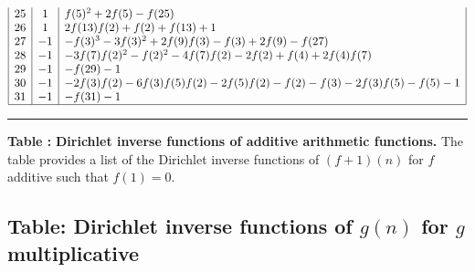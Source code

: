 \documentclass[11pt,reqno,a4letter]{article}
\numberwithin{figure}{section}
\numberwithin{table}{section}
\theoremstyle{plain}
\numberwithin{theorem}{section}
\theoremstyle{definition}
\newcommand{\NBRef}[1]{
     \todo[linecolor=green!85!white,backgroundcolor=orange!50!white,bordercolor=blue!30!black,textcolor=cyan!15!black,shadow,size=\small,fancyline]{
     \color{NBRefColor}{\textbf{#1}
     }
     }
}
\begin{document}
\begin{table}[h!]
\begin{equation*}
{\begin{array}{|c|c|l|}
 25 & 1 & f(5)^2+2 f(5)-f(25) \\
 26 & 1 & 2 f(13) f(2)+f(2)+f(13)+1 \\
 27 & -1 & -f(3)^3-3 f(3)^2+2 f(9) f(3)-f(3)+2 f(9)-f(27) \\
 28 & -1 & -3 f(7) f(2)^2-f(2)^2-4 f(7) f(2)-2 f(2)+f(4)+2 f(4) f(7) \\
 29 & -1 & -f(29)-1 \\
 30 & -1 & -2 f(3) f(2)-6 f(3) f(5) f(2)-2 f(5) f(2)-f(2)-f(3)-2 f(3) f(5)-f(5)-1 \\
 31 & -1 & -f(31)-1 \\ 
   \hline 
\end{array}
}
\end{equation*} 

\bigskip\hrule\smallskip 

\caption*{\textbf{\rm \bf Table \thesubsection:} 
          \textbf{Dirichlet inverse functions of additive arithmetic functions.} 
          The table provides a list of the Dirichlet inverse functions of $(f+1)(n)$ for 
          $f$ additive such that $f(1) = 0$. } 

\end{table}

\NBRef{A04-2020-04026}

\newpage 
\subsection{Table: Dirichlet inverse functions of $g(n)$ for $g$ multiplicative} 
\label{table_DirInvFuncExps_gnMultiplicative}
\end{document}
